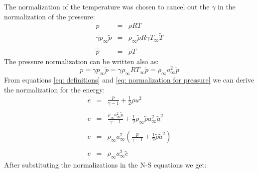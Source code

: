 \documentclass[11pt, a4paper]{article}
\begin{document}
\noindent The normalization of the temperature was chosen to cancel out the $\gamma$ in the normalization of the pressure:
\begin{equation}
    \begin{array}{lcl}
        p & = & \rho RT \\
        \gamma p_\infty\tilde{p} & = & \rho_\infty\tilde{\rho}R\gamma T_\infty\tilde{T} \\
        \tilde{p} & = & \tilde{\rho}\tilde{T}
    \end{array}
\end{equation}
The pressure normalization can be written also as:
\begin{equation}
    p=\gamma p_\infty\tilde{p}=\gamma\rho_\infty RT_\infty\tilde{p}=\rho_\infty a_\infty^2\tilde{p}
    \label{eq: normalization for pressure}
\end{equation}
From equations \ref{eq: definitions} and \ref{eq: normalization for pressure} we can derive the normalization for the energy:
\begin{equation}
    \begin{array}{lcl}
        e & = & \displaystyle\frac{p}{\gamma-1}+\frac{1}{2}\rho u^2 \\\\
        e & = & \displaystyle\frac{\rho_\infty a_\infty^2\tilde{p}}{\gamma-1}+\frac{1}{2}\rho_\infty\tilde{\rho}a_\infty^2\tilde{a}^2 \\\\
        e & = & \displaystyle \rho_\infty a_\infty^2\left(\frac{\tilde{p}}{\gamma-1}+\frac{1}{2}\tilde{\rho}\tilde{a}^2\right) \\\\
        e & = & \rho_\infty a_\infty^2\tilde{e}
    \end{array}
\end{equation}
After substituting the normalizations in the N-S equations we get:
\end{document}
